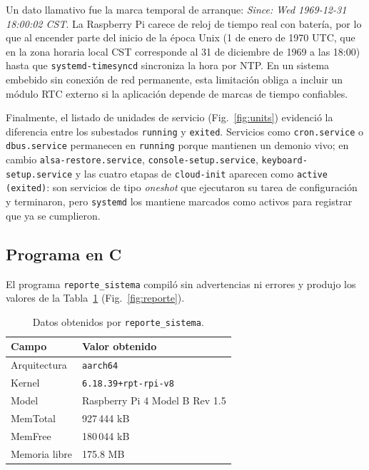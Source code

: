 \documentclass[conference]{IEEEtran}
\begin{document}
Un dato llamativo fue la marca temporal de arranque: \textit{Since: Wed 1969-12-31 18:00:02 CST}. La Raspberry Pi carece de reloj de tiempo real con batería, por lo que al encender parte del inicio de la época Unix (1 de enero de 1970 UTC, que en la zona horaria local CST corresponde al 31 de diciembre de 1969 a las 18:00) hasta que \texttt{systemd-timesyncd} sincroniza la hora por NTP. En un sistema embebido sin conexión de red permanente, esta limitación obliga a incluir un módulo RTC externo si la aplicación depende de marcas de tiempo confiables.

Finalmente, el listado de unidades de servicio (Fig.~\ref{fig:units}) evidenció la diferencia entre los subestados \texttt{running} y \texttt{exited}. Servicios como \texttt{cron.service} o \texttt{dbus.service} permanecen en \texttt{running} porque mantienen un demonio vivo; en cambio \texttt{alsa-restore.service}, \texttt{console-setup.service}, \texttt{keyboard-setup.service} y las cuatro etapas de \texttt{cloud-init} aparecen como \texttt{active (exited)}: son servicios de tipo \textit{oneshot} que ejecutaron su tarea de configuración y terminaron, pero \texttt{systemd} los mantiene marcados como activos para registrar que ya se cumplieron.

\subsection{Programa en C}
El programa \texttt{reporte\_sistema} compiló sin advertencias ni errores y produjo los valores de la Tabla~\ref{tab:reporte} (Fig.~\ref{fig:reporte}).

\begin{table}[H]
	\centering
	\caption{Datos obtenidos por \texttt{reporte\_sistema}.}
	\label{tab:reporte}
	\begin{tabular}{|l|l|}
		\hline
		\textbf{Campo} & \textbf{Valor obtenido} \\
		\hline
		Arquitectura & \texttt{aarch64} \\
		\hline
		Kernel & \texttt{6.18.39+rpt-rpi-v8} \\
		\hline
		Model & Raspberry Pi 4 Model B Rev 1.5 \\
		\hline
		MemTotal & 927\,444 kB \\
		\hline
		MemFree & 180\,044 kB \\
		\hline
		Memoria libre & 175.8 MB \\
		\hline
	\end{tabular}
\end{table}
\end{document}
